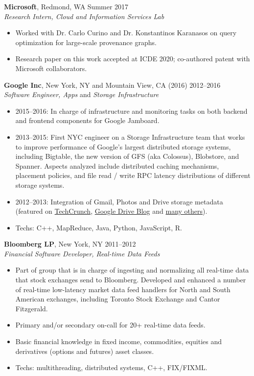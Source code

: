 \documentclass[line,margin]{res}
\begin{document}
\begin{resume}
  \textbf{Microsoft}, Redmond, WA \hfill Summer 2017 \\
  {\sl Research Intern, Cloud and Information Services Lab}
  \begin{itemize}
  \item Worked with Dr. Carlo Curino and Dr. Konstantinos Karanasos on query optimization for large-scale provenance graphs.
  \item Research paper on this work accepted at ICDE 2020; co-authored patent with Microsoft collaborators.
  \end{itemize}

  \textbf{Google Inc}, New York, NY and Mountain View, CA (2016) \hfill 2012--2016 \\
  {\sl Software Engineer, Apps} and {\sl Storage Infrastructure}
  \begin{itemize}  \itemsep -2pt
  \item  2015--2016: In charge of infrastructure and monitoring tasks on both backend and frontend components for Google Jamboard.
  \item  2013--2015: First NYC engineer on a Storage Infrastructure team that works to improve
  performance of Google's largest distributed storage systems, including Bigtable, the new
  version of GFS (aka Colossus), Blobstore, and Spanner.  Aspects analyzed include
  distributed caching mechanisms, placement policies, and file read / write RPC latency
  distributions of different storage systems.
  \item 2012--2013: Integration of Gmail, Photos and Drive storage metadata (featured on
  \href{http://goo.gl/y8cpvZ}{TechCrunch}, \href{http://googledrive.blogspot.com/2013/05/bringing-it-all-together-15-gb-now.html}{Google Drive Blog}
  and \href{https://www.google.com/search?q=google\%20unifies\%20drive\%20gmail\%20google\%20photos\%2015gb}{many others}).
  \item Techs: C++, MapReduce, Java, Python, JavaScript, R.
  \end{itemize}

  \textbf{Bloomberg LP}, New York, NY \hfill 2011--2012 \\
  {\sl Financial Software Developer, Real-time Data Feeds}
  \begin{itemize}  \itemsep -2pt
  \item Part of group that is in charge of ingesting and normalizing all real-time data that stock exchanges send to Bloomberg.  Developed and enhanced a number of real-time low-latency market data feed handlers for North and South American exchanges, including Toronto Stock Exchange and Cantor Fitzgerald.
  \item Primary and/or secondary on-call for 20+ real-time data feeds.
  \item Basic financial knowledge in fixed income, commodities, equities and derivatives (options and futures) asset classes.
  \item Techs: multithreading, distributed systems, C++, FIX/FIXML.
  \end{itemize}


\end{resume}
\end{document}
